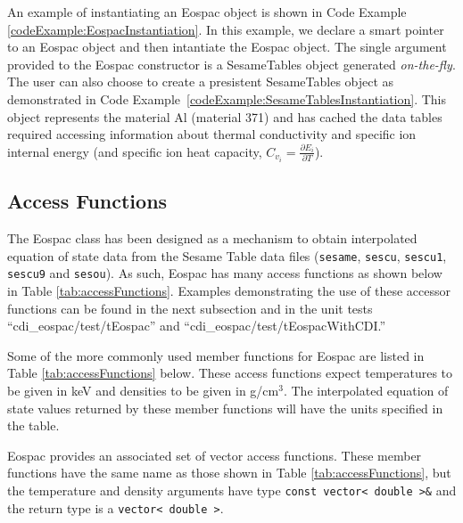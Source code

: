 \documentclass[11pt]{nmemo}
\begin{document}
An example of instantiating an Eospac object is shown in Code Example
\ref{codeExample:EospacInstantiation}.  In this example, we declare a
smart pointer to an Eospac object and then intantiate the Eospac
object.  The single argument provided to the Eospac constructor is a
SesameTables object generated \emph{on-the-fly}.  The user can also
choose to create a presistent SesameTables object as demonstrated in
Code Example~\ref{codeExample:SesameTablesInstantiation}.  This object
represents the material Al (material 371) and has cached the data
tables required accessing information about thermal conductivity and
specific ion internal energy (and specific ion heat capacity, $C_{v_i} =
\frac{\partial E_i} {\partial T}$).



\subsection{Access Functions}

The Eospac class has been designed as a mechanism to obtain
interpolated equation of state data from the Sesame Table data files
(\texttt{sesame}, \texttt{sescu}, \texttt{sescu1}, \texttt{sescu9} and
\texttt{sesou}).  As such, Eospac has many access functions as shown
below in Table \ref{tab:accessFunctions}.  Examples demonstrating the
use of these accessor functions can be found in the next subsection
and in the unit tests ``cdi\_eospac/test/tEospac'' and
``cdi\_eospac/test/tEospacWithCDI.''


Some of the more commonly used member functions for Eospac are listed
in Table \ref{tab:accessFunctions} below.  These access functions
expect temperatures to be given in keV and densities to be given in
g/cm$^3$.  The interpolated equation of state values returned by these
member functions will have the units specified in the table.

Eospac provides an associated set of vector access functions.  These
member functions have the same name as those shown in
Table \ref{tab:accessFunctions}, but the temperature and density
arguments have type \texttt{const~vector< double >\&} and the return
type is a \texttt{vector< double >}.
\end{document}
